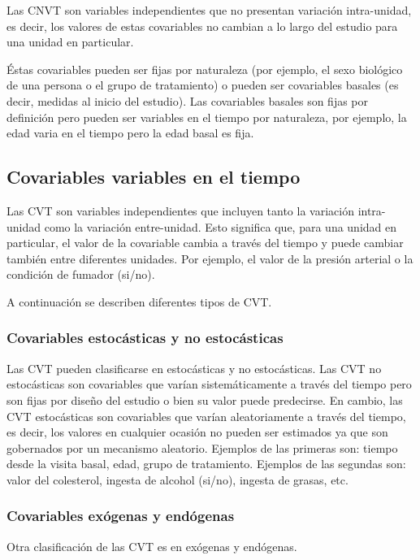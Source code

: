\documentclass[spanish]{article}
\numberwithin{figure}{subsection}
\numberwithin{equation}{subsection}
\numberwithin{table}{subsection}
\begin{document}
Las CNVT son variables independientes que no presentan variación intra-unidad,
es decir, los valores de estas covariables no cambian a lo largo del estudio
para una unidad en particular.

Éstas covariables pueden ser fijas por naturaleza (por ejemplo, el sexo
biológico de una persona o el grupo de tratamiento) o pueden ser covariables
basales (es decir, medidas al inicio del estudio). Las covariables basales son
fijas por definición pero pueden ser variables en el tiempo por naturaleza, por
ejemplo, la edad varia en el tiempo pero la edad basal es fija.

\subsection{Covariables variables en el tiempo}

Las CVT son variables independientes que incluyen tanto la variación
intra-unidad como la variación entre-unidad. Esto significa que, para una
unidad en particular, el valor de la covariable cambia a través del tiempo y
puede cambiar también entre diferentes unidades. Por ejemplo, el valor de la
presión arterial o la condición de fumador (si/no).

A continuación se describen diferentes tipos de CVT.

\subsubsection{Covariables estocásticas y no estocásticas}

Las CVT pueden clasificarse en estocásticas y no estocásticas. Las CVT no
estocásticas son covariables que varían sistemáticamente a través del tiempo
pero son fijas por diseño del estudio o bien su valor puede predecirse. En
cambio, las CVT estocásticas son covariables que varían aleatoriamente a través
del tiempo, es decir, los valores en cualquier ocasión no pueden ser estimados
ya que son gobernados por un mecanismo aleatorio. Ejemplos de las primeras son:
tiempo desde la visita basal, edad, grupo de tratamiento. Ejemplos de las
segundas son: valor del colesterol, ingesta de alcohol (si/no), ingesta de
grasas, etc.

\subsubsection{Covariables exógenas y endógenas}
\label{seccion_de_exogeneidad}

Otra clasificación de las CVT es en exógenas y endógenas.
\end{document}
